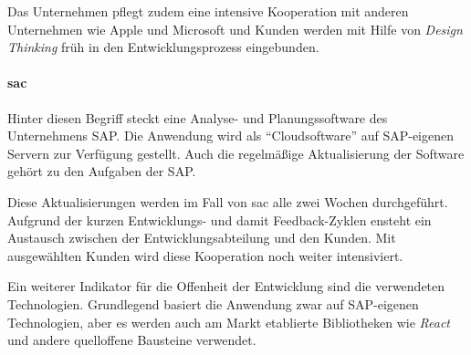 Das Unternehmen pflegt zudem eine intensive Kooperation mit anderen Unternehmen
wie Apple \cite{Appleund81:online} und Microsoft \cite{Microsof58:online} und
Kunden werden mit Hilfe von \textit{Design Thinking} \cite{SAPDesig64:online} früh in den Entwicklungsprozess eingebunden.



\paragraph{\ac{sac}}\label{sec:beispiele-sap-sac}
Hinter diesen Begriff steckt eine Analyse- und Planungssoftware des Unternehmens SAP.
Die Anwendung wird als \enquote{Cloudsoftware} auf SAP-eigenen Servern zur Verfügung gestellt.
Auch die regelmäßige Aktualisierung der Software gehört zu den Aufgaben der SAP.

Diese Aktualisierungen werden im Fall von \ac{sac} alle zwei Wochen durchgeführt.
Aufgrund der kurzen Entwicklungs- und damit Feedback-Zyklen ensteht ein Austausch zwischen der Entwicklungsabteilung und den Kunden.
Mit ausgewählten Kunden wird diese Kooperation noch weiter intensiviert.

Ein weiterer Indikator für die Offenheit der Entwicklung sind die verwendeten Technologien.
Grundlegend basiert die Anwendung zwar auf SAP-eigenen Technologien,
aber es werden auch am Markt etablierte Bibliotheken wie \textit{React} und andere quelloffene Bausteine verwendet.
